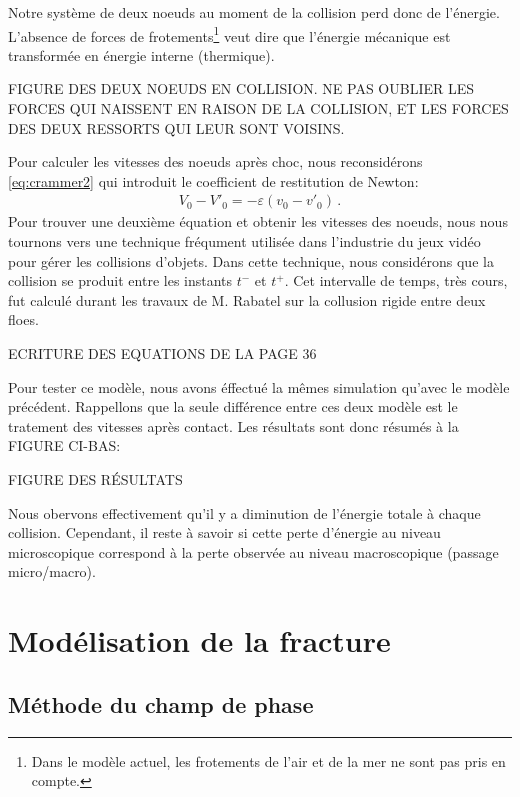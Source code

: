 Notre système de deux noeuds au moment de la collision perd donc de l'énergie. L'absence de forces de frotements\footnote{Dans le modèle actuel, les frotements de l'air et de la mer ne sont pas pris en compte.} veut dire que l'énergie mécanique est transformée en énergie interne (thermique). 

FIGURE DES DEUX NOEUDS EN COLLISION. NE PAS OUBLIER LES FORCES QUI NAISSENT EN RAISON DE LA COLLISION, ET LES FORCES DES DEUX RESSORTS QUI LEUR SONT VOISINS.

Pour calculer les vitesses des noeuds après choc, nous reconsidérons \cref{eq:crammer2} qui introduit le coefficient de restitution de Newton:
\begin{align}
    V_0 - V'_0 = - \varepsilon (v_0 - v'_0) \,.
\end{align}
Pour trouver une deuxième équation et obtenir les vitesses des noeuds, nous nous tournons vers une technique fréqument utilisée dans l'industrie du jeux vidéo\parencite{hecker1997collision} pour gérer les collisions d'objets. Dans cette technique, nous considérons que la collision se produit entre les instants $t^{-}$ et $t^{+}$. Cet intervalle de temps, très cours, fut calculé durant les travaux de M. Rabatel \parencite[p.87]{rabatel2015thesis} sur la collusion rigide entre deux floes. 

ECRITURE DES EQUATIONS DE LA PAGE 36

Pour tester ce modèle, nous avons éffectué la mêmes simulation qu'avec le modèle précédent. Rappellons que la seule différence entre ces deux modèle est le tratement des vitesses après contact. Les résultats sont donc résumés à la FIGURE CI-BAS:

FIGURE DES RÉSULTATS

Nous obervons effectivement qu'il y a diminution de l'énergie totale à chaque collision. Cependant, il reste à savoir si cette perte d'énergie au niveau microscopique correspond à la perte observée au niveau macroscopique (passage micro/macro).







\section{Modélisation de la fracture}


\subsection{Méthode du champ de phase}
\label{subsubsec:approchephase}


